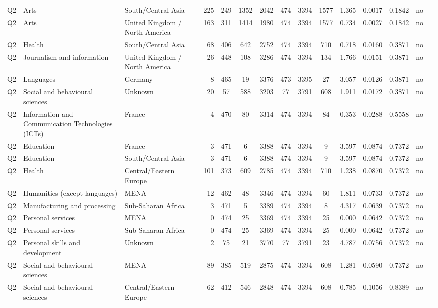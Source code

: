 \begin{longtable}{lllrcccccccccll}
Q2 & Arts & South/Central Asia & 225 & 249 & 1352 & 2042 & 474 & 3394 & 1577 & 1.365 & 0.0017 & 0.1842 & no \\
Q2 & Arts & United Kingdom / North America & 163 & 311 & 1414 & 1980 & 474 & 3394 & 1577 & 0.734 & 0.0027 & 0.1842 & no \\
Q2 & Health & South/Central Asia & 68 & 406 & 642 & 2752 & 474 & 3394 & 710 & 0.718 & 0.0160 & 0.3871 & no \\
Q2 & Journalism and information & United Kingdom / North America & 26 & 448 & 108 & 3286 & 474 & 3394 & 134 & 1.766 & 0.0151 & 0.3871 & no \\
Q2 & Languages & Germany & 8 & 465 & 19 & 3376 & 473 & 3395 & 27 & 3.057 & 0.0126 & 0.3871 & no \\
Q2 & Social and behavioural sciences & Unknown & 20 & 57 & 588 & 3203 & 77 & 3791 & 608 & 1.911 & 0.0172 & 0.3871 & no \\
Q2 & Information and Communication Technologies (ICTs) & France & 4 & 470 & 80 & 3314 & 474 & 3394 & 84 & 0.353 & 0.0288 & 0.5558 & no \\
Q2 & Education & France & 3 & 471 & 6 & 3388 & 474 & 3394 & 9 & 3.597 & 0.0874 & 0.7372 & no \\
Q2 & Education & South/Central Asia & 3 & 471 & 6 & 3388 & 474 & 3394 & 9 & 3.597 & 0.0874 & 0.7372 & no \\
Q2 & Health & Central/Eastern Europe & 101 & 373 & 609 & 2785 & 474 & 3394 & 710 & 1.238 & 0.0870 & 0.7372 & no \\
Q2 & Humanities (except languages) & MENA & 12 & 462 & 48 & 3346 & 474 & 3394 & 60 & 1.811 & 0.0733 & 0.7372 & no \\
Q2 & Manufacturing and processing & Sub-Saharan Africa & 3 & 471 & 5 & 3389 & 474 & 3394 & 8 & 4.317 & 0.0639 & 0.7372 & no \\
Q2 & Personal services & MENA & 0 & 474 & 25 & 3369 & 474 & 3394 & 25 & 0.000 & 0.0642 & 0.7372 & no \\
Q2 & Personal services & Sub-Saharan Africa & 0 & 474 & 25 & 3369 & 474 & 3394 & 25 & 0.000 & 0.0642 & 0.7372 & no \\
Q2 & Personal skills and development & Unknown & 2 & 75 & 21 & 3770 & 77 & 3791 & 23 & 4.787 & 0.0756 & 0.7372 & no \\
Q2 & Social and behavioural sciences & MENA & 89 & 385 & 519 & 2875 & 474 & 3394 & 608 & 1.281 & 0.0590 & 0.7372 & no \\
Q2 & Social and behavioural sciences & Central/Eastern Europe & 62 & 412 & 546 & 2848 & 474 & 3394 & 608 & 0.785 & 0.1056 & 0.8389 & no \\

\end{longtable}
